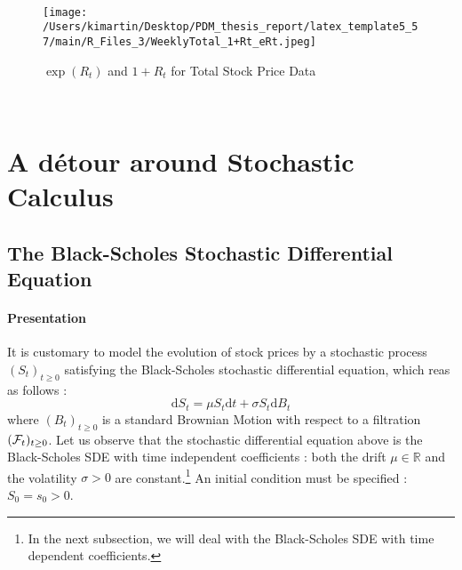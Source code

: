 \\
\begin{figure}[h!]
	\centering
	\begin{minipage}[b]{0.4\textwidth}
		\centering
		\texttt{[image: /Users/kimartin/Desktop/PDM\_thesis\_report/latex\_template5\_57/main/R\_Files\_3/WeeklyTotal\_1+Rt\_eRt.jpeg]}
		\caption{$\exp(R_t)$ and $1 + R_t$ for Total Stock Price Data}
		\label{fig:TotalCompApproxStock}
	\end{minipage}
\end{figure}
\\


\section{A détour around Stochastic Calculus}
\subsection{The Black-Scholes Stochastic Differential Equation}
\paragraph{Presentation}
It is customary to model the evolution of stock prices by a stochastic process $(S_t)_{t \ge 0}$ satisfying the Black-Scholes stochastic differential equation, which reas as follows : 
\begin{equation}
\mathrm{d}S_t = \mu S_t \mathrm{d}t + \sigma S_t \mathrm{d}B_t
\end{equation}
where $(B_t)_{t \ge 0}$ is a standard Brownian Motion with respect to a filtration $({\cal{F}}_t)_{t \ge 0}$. Let us observe that the stochastic differential equation above is the Black-Scholes SDE with time independent coefficients : both the drift $\mu \in \mathbb{R}$ and the volatility $\sigma > 0$ are constant.\footnote{In the next subsection, we will deal with the Black-Scholes SDE with time dependent coefficients.} An initial condition must be specified : $S_0 = s_0 > 0$.
